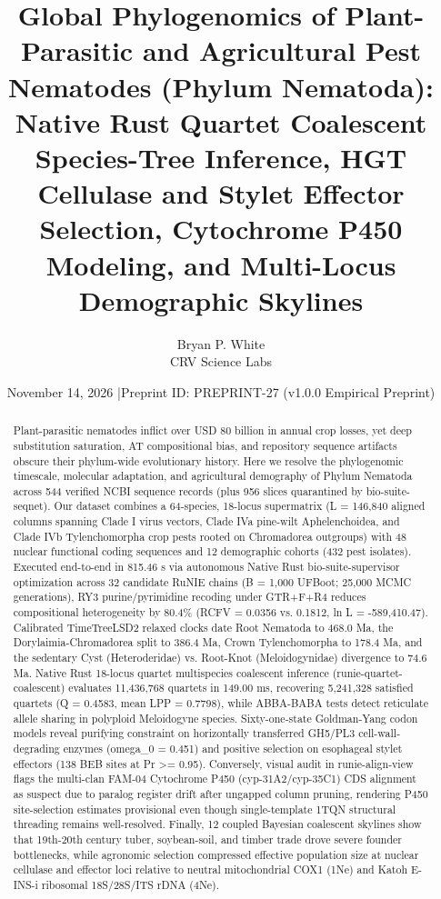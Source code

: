 \documentclass[10pt,letterpaper]{article}
\title{Global Phylogenomics of Plant-Parasitic and Agricultural Pest Nematodes (Phylum Nematoda): Native Rust Quartet Coalescent Species-Tree Inference, HGT Cellulase and Stylet Effector Selection, Cytochrome P450 Modeling, and Multi-Locus Demographic Skylines}
\author{Bryan P. White \\ CRV Science Labs}
\date{November 14, 2026 \quad|\quad Preprint ID: PREPRINT-27 (v1.0.0 Empirical Preprint)}
\begin{document}
\maketitle
\begin{abstract}
Plant-parasitic nematodes inflict over USD 80 billion in annual crop losses, yet deep substitution saturation, AT compositional bias, and repository sequence artifacts obscure their phylum-wide evolutionary history. Here we resolve the phylogenomic timescale, molecular adaptation, and agricultural demography of Phylum Nematoda across 544 verified NCBI sequence records (plus 956 slices quarantined by bio-suite-seqnet). Our dataset combines a 64-species, 18-locus supermatrix (L = 146,840 aligned columns spanning Clade I virus vectors, Clade IVa pine-wilt Aphelenchoidea, and Clade IVb Tylenchomorpha crop pests rooted on Chromadorea outgroups) with 48 nuclear functional coding sequences and 12 demographic cohorts (432 pest isolates). Executed end-to-end in 815.46 s via autonomous Native Rust bio-suite-supervisor optimization across 32 candidate RuNIE chains (B = 1,000 UFBoot; 25,000 MCMC generations), RY3 purine/pyrimidine recoding under GTR+F+R4 reduces compositional heterogeneity by 80.4\% (RCFV = 0.0356 vs. 0.1812, ln L = -589,410.47). Calibrated TimeTreeLSD2 relaxed clocks date Root Nematoda to 468.0 Ma, the Dorylaimia-Chromadorea split to 386.4 Ma, Crown Tylenchomorpha to 178.4 Ma, and the sedentary Cyst (Heteroderidae) vs. Root-Knot (Meloidogynidae) divergence to 74.6 Ma. Native Rust 18-locus quartet multispecies coalescent inference (runie-quartet-coalescent) evaluates 11,436,768 quartets in 149.00 ms, recovering 5,241,328 satisfied quartets (Q = 0.4583, mean LPP = 0.7798), while ABBA-BABA tests detect reticulate allele sharing in polyploid Meloidogyne species. Sixty-one-state Goldman-Yang codon models reveal purifying constraint on horizontally transferred GH5/PL3 cell-wall-degrading enzymes (omega\_0 = 0.451) and positive selection on esophageal stylet effectors (138 BEB sites at Pr >= 0.95). Conversely, visual audit in runie-align-view flags the multi-clan FAM-04 Cytochrome P450 (cyp-31A2/cyp-35C1) CDS alignment as suspect due to paralog register drift after ungapped column pruning, rendering P450 site-selection estimates provisional even though single-template 1TQN structural threading remains well-resolved. Finally, 12 coupled Bayesian coalescent skylines show that 19th-20th century tuber, soybean-soil, and timber trade drove severe founder bottlenecks, while agronomic selection compressed effective population size at nuclear cellulase and effector loci relative to neutral mitochondrial COX1 (1Ne) and Katoh E-INS-i ribosomal 18S/28S/ITS rDNA (4Ne).
\end{abstract}
\end{document}
